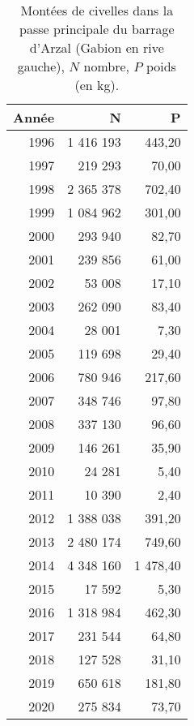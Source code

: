 \begin{table}[htbp]
\centering
\begin{tabular}{rrr}
  \hline
Année & N & P \\ 
  \hline
1996 & 1 416 193 & 443,20 \\ 
  1997 & 219 293 & 70,00 \\ 
  1998 & 2 365 378 & 702,40 \\ 
  1999 & 1 084 962 & 301,00 \\ 
  2000 & 293 940 & 82,70 \\ 
  2001 & 239 856 & 61,00 \\ 
  2002 & 53 008 & 17,10 \\ 
  2003 & 262 090 & 83,40 \\ 
  2004 & 28 001 & 7,30 \\ 
  2005 & 119 698 & 29,40 \\ 
  2006 & 780 946 & 217,60 \\ 
  2007 & 348 746 & 97,80 \\ 
  2008 & 337 130 & 96,60 \\ 
  2009 & 146 261 & 35,90 \\ 
  2010 & 24 281 & 5,40 \\ 
  2011 & 10 390 & 2,40 \\ 
  2012 & 1 388 038 & 391,20 \\ 
  2013 & 2 480 174 & 749,60 \\ 
  2014 & 4 348 160 & 1 478,40 \\ 
  2015 & 17 592 & 5,30 \\ 
  2016 & 1 318 984 & 462,30 \\ 
  2017 & 231 544 & 64,80 \\ 
  2018 & 127 528 & 31,10 \\ 
  2019 & 650 618 & 181,80 \\ 
  2020 & 275 834 & 73,70 \\ 
   \hline
\end{tabular}
\caption{Montées de civelles dans la passe principale du barrage d'Arzal (Gabion en rive gauche), $N$ nombre,
		$P$ poids (en kg).} 
\label{table_civelle_6}
\end{table}
